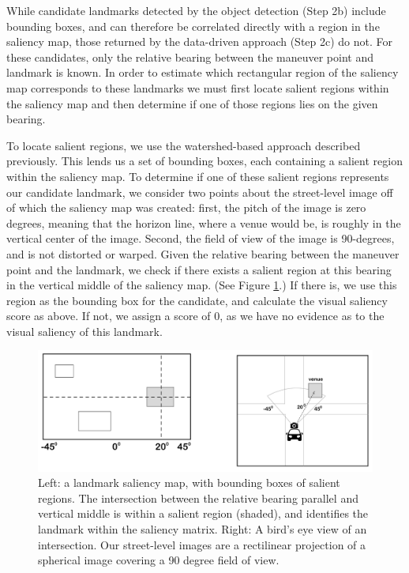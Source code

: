 While candidate landmarks detected by the object detection (Step 2b) include bounding boxes, and can therefore be correlated directly with a region in the saliency map, those returned by the data-driven approach (Step 2c) do not. For these candidates, only the relative bearing between the maneuver point and landmark is known. In order to estimate which rectangular region of the saliency map corresponds to these landmarks we must first locate salient regions within the saliency map and then determine if one of those regions lies on the given bearing.

To locate salient regions, we use the watershed-based approach described previously. This lends us a set of bounding boxes, each containing a salient region within the saliency map. To determine if one of these salient regions represents our candidate landmark, we consider two points about the street-level image off of which the saliency map was created: first, the pitch of the image is zero degrees, meaning that the horizon line, where a venue would be, is roughly in the vertical center of the image. Second, the field of view of the image is 90-degrees, and is not distorted or warped. Given the relative bearing between the maneuver point and the landmark, we check if there exists a salient region at this bearing in the vertical middle of the saliency map. (See Figure \ref{fig:landmark_search}.) If there is, we use this region as the bounding box for the candidate, and calculate the visual saliency score as above. If not, we assign a score of 0, as we have no evidence as to the visual saliency of this landmark.

\begin{figure}[htbp]
  \centering
  \includegraphics[width=\textwidth]{images/landmark_search.pdf}
  \caption{Left: a landmark saliency map, with bounding boxes of salient regions. The intersection between the relative bearing parallel and vertical middle is within a salient region (shaded), and identifies the landmark within the saliency matrix. Right: A bird's eye view of an intersection. Our street-level images are a rectilinear projection of a spherical image covering a 90 degree field of view.}
  \label{fig:landmark_search}
\end{figure}

